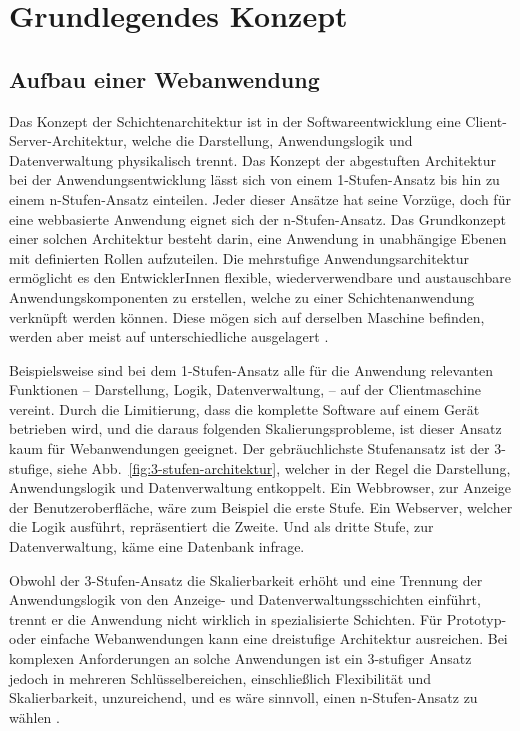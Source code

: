 \chapter{Grundlegendes Konzept}

\section{Aufbau einer Webanwendung}
\label{cha:webapplication_structure}

Das Konzept der Schichtenarchitektur ist in der Softwareentwicklung eine Client-Server-Architektur, welche die Darstellung, Anwendungslogik und Datenverwaltung physikalisch trennt.  
Das Konzept der abgestuften Architektur bei der Anwendungsentwicklung lässt sich von einem 1-Stufen-Ansatz bis hin zu einem n-Stufen-Ansatz einteilen. Jeder dieser Ansätze hat seine Vorzüge, doch für eine webbasierte Anwendung eignet sich der n-Stufen-Ansatz. Das Grundkonzept einer solchen Architektur besteht darin, eine Anwendung in unabhängige Ebenen mit definierten Rollen aufzuteilen.
Die mehrstufige Anwendungsarchitektur ermöglicht es den EntwicklerInnen flexible, wiederverwendbare und austauschbare Anwendungskomponenten zu erstellen, welche zu einer Schichtenanwendung verknüpft werden können.
Diese mögen sich auf derselben Maschine befinden, werden aber meist auf unterschiedliche ausgelagert \cite{wiki-ntier-architecture}.

Beispielsweise sind bei dem 1-Stufen-Ansatz alle für die Anwendung relevanten Funktionen -- Darstellung, Logik, Datenverwaltung, \etc -- auf der Clientmaschine vereint. Durch die Limitierung, dass die komplette Software auf einem Gerät betrieben wird, und die daraus folgenden Skalierungsprobleme, ist dieser Ansatz kaum für Webanwendungen geeignet.
Der gebräuchlichste Stufenansatz ist der 3-stufige, siehe Abb.~\ref{fig:3-stufen-architektur}, welcher in der Regel die Darstellung, Anwendungslogik und Datenverwaltung entkoppelt. Ein Webbrowser, zur Anzeige der Benutzeroberfläche, wäre zum Beispiel die erste Stufe. Ein Webserver, welcher die Logik ausführt, repräsentiert die Zweite. Und als dritte Stufe, zur Datenverwaltung, käme eine Datenbank infrage. 

Obwohl der 3-Stufen-Ansatz die Skalierbarkeit erhöht und eine Trennung der Anwendungslogik von den Anzeige- und Datenverwaltungsschichten einführt, trennt er die Anwendung nicht wirklich in spezialisierte Schichten. Für Prototyp- oder einfache Webanwendungen kann eine dreistufige Architektur ausreichen. Bei komplexen Anforderungen an solche Anwendungen ist ein 3-stufiger Ansatz jedoch in mehreren Schlüsselbereichen, einschließlich Flexibilität und Skalierbarkeit, unzureichend, und es wäre sinnvoll, einen n-Stufen-Ansatz zu wählen \cite{nTier-architecture}.


